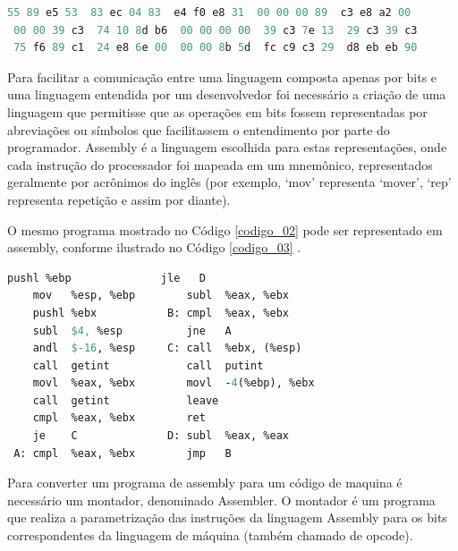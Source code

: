 \begin{lstlisting}[language=Pascal,frame=single,captionpos=b,
												caption={Algoritmo de 
									   Euclides estendido representado 
									   em código de máquina,com adaptações},
                                                            label=codigo_02]
 55 89 e5 53  83 ec 04 83  e4 f0 e8 31  00 00 00 89  c3 e8 a2 00
 00 00 39 c3  74 10 8d b6  00 00 00 00  39 c3 7e 13  29 c3 39 c3
 75 f6 89 c1  24 e8 6e 00  00 00 8b 5d  fc c9 c3 29  d8 eb eb 90
\end{lstlisting}

Para facilitar a comunicação entre uma linguagem composta apenas por bits e 
uma linguagem entendida por um desenvolvedor foi necessário a criação de uma
 linguagem que permitisse que as operações em bits fossem representadas por 
abreviações ou símbolos que facilitassem o entendimento por parte do programador.
 Assembly é a linguagem escolhida para estas representações, onde cada 
instrução do processador foi mapeada em um mnemônico, representados geralmente 
por acrônimos do inglês (por exemplo, ‘mov’ representa ‘mover’, ‘rep’ 
representa repetição e assim por diante)\cite{ref34}.

O mesmo programa mostrado no Código \ref{codigo_02} pode ser representado 
em assembly, conforme ilustrado no Código \ref{codigo_03} \cite{ref34}. 

\begin{lstlisting}[language=Pascal,frame=single,captionpos=b,caption={Algoritmo de 
                Euclides estendido representado em Assembly, com adaptações},
                                                            label=codigo_03]
    pushl %ebp              jle   D
    mov   %esp, %ebp        subl  %eax, %ebx
    pushl %ebx           B: cmpl  %eax, %ebx   
    subl  $4, %esp          jne   A
    andl  $-16, %esp     C: call  %ebx, (%esp)
    call  getint            call  putint
    movl  %eax, %ebx        movl  -4(%ebp), %ebx
    call  getint            leave
    cmpl  %eax, %ebx        ret
    je    C              D: subl  %eax, %eax
 A: cmpl  %eax, %ebx        jmp   B

\end{lstlisting}

Para converter um programa de assembly para um código de maquina é necessário
 um montador, denominado Assembler. O montador é um programa que realiza a 
parametrização das instruções da linguagem Assembly para os bits 
correspondentes da linguagem de máquina (também chamado de opcode)\cite{ref35}.

